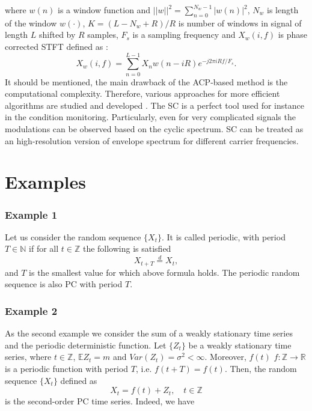 where $w(n)$ is a window function and $||w||^2=\sum_{n=0}^{N_w-1}|w(n)|^2$, $N_w$ is length of the window $w(\cdot)$, $K=(L-N_w+R)/R$ is number of windows in signal of length $L$ shifted by $R$ samples, $F_s$ is a sampling frequency and $X_w(i,f)$ is phase corrected STFT defined as \cite{antoni2017fast}:
\begin{equation}
    X_w(i,f)=\sum_{n=0}^{L-1}X_nw(n-iR)e^{-j2\pi iRf/F_s}.
\end{equation} 
It should be mentioned, the main drawback of the ACP-based method is the computational complexity. Therefore, various approaches for more efficient algorithms are studied and developed \cite{antoni2017fast,borghesani2018faster}.
The SC is a perfect tool used for instance in the condition monitoring. Particularly, even for very complicated signals the modulations can be observed based on the cyclic spectrum. SC can be treated as an high-resolution version of envelope spectrum for different carrier frequencies.
\section{Examples}
\label{sec:examples Gaussian}
\subsubsection*{Example 1}
Let us consider the random sequence $\{X_t\}$. It is called periodic, with period $T\in \mathbb{N}$ if for all $t\in \mathbb{Z}$ the following is satisfied 
\begin{equation}
X_{t+T}\overset{d}{=}X_{t},
\end{equation}
and $T$ is the smallest value for which above formula holds. The periodic random sequence is also PC with period $T$.

\subsubsection*{Example 2}
As the second example we consider the sum of a weakly stationary time series and the periodic deterministic function. Let $\{Z_t\}$ be a weakly stationary time series, where $t\in \mathbb{Z}$, $\mathbb{E}Z_t=m$ and $Var(Z_t)=\sigma ^2<\infty$. Moreover, $f(t)$ $f:\mathbb{Z}\rightarrow \mathbb{R}$ is a periodic function with period $T$, i.e. $f(t+T)=f(t)$. Then, the random sequence $\{X_t\}$ defined as
\begin{equation}\label{ex1}
    X_t=f(t)+Z_t, \quad t\in \mathbb{Z}
\end{equation}
is the second-order PC time series. Indeed, we have

